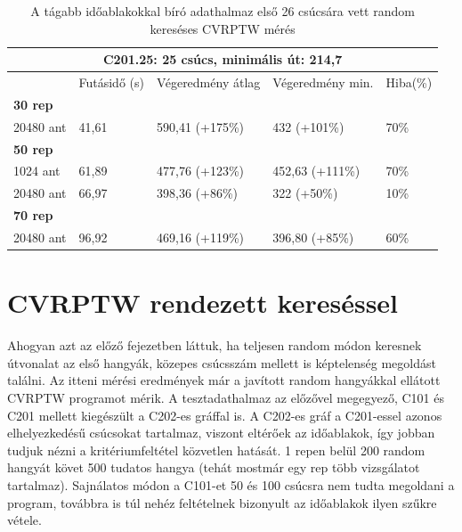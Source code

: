 \begin{table}[ht!]
	\centering
	\begin{tabular}{|p{1.75cm}||p{2cm}|p{3.25cm}|p{3.25cm}|p{1.5cm}|}
		\hline
		\multicolumn{5}{|c|}{C201.25: 25 csúcs, minimális út: 214,7} \\
		\hline
		& Futásidő (s) & Végeredmény átlag & Végeredmény min. & Hiba(\%) \\
		\hline
		\textbf{30 rep} &  &  &  &  \\
		20480 ant & 41,61 & 590,41 (+175\%) & 432 (+101\%) & 70\%  \\
		\hline
		\textbf{50 rep} &  &  &  &  \\
		1024 ant & 61,89 & 477,76 (+123\%) & 452,63 (+111\%) & 70\% \\
		20480 ant & 66,97 & 398,36 (+86\%) & 322 (+50\%) & 10\% \\
		\hline
		\textbf{70 rep} &  &  &  &  \\
		20480 ant & 96,92 & 469,16 (+119\%) & 396,80 (+85\%) & 60\% \\
		\hline
	\end{tabular}
	\caption{A tágabb időablakokkal bíró adathalmaz első 26 csúcsára vett random kereséses CVRPTW mérés}
	\label{table:VRTPW_25_2}
\end{table}



\section{CVRPTW rendezett kereséssel}

Ahogyan azt az előző fejezetben láttuk, ha teljesen random módon keresnek útvonalat az első hangyák, közepes csúcsszám mellett is képtelenség megoldást találni. Az itteni mérési eredmények már a javított random hangyákkal ellátott CVRPTW programot mérik. A tesztadathalmaz az előzővel megegyező, C101 és C201 mellett kiegészült a C202-es gráffal is. A C202-es gráf a C201-essel azonos elhelyezkedésű csúcsokat tartalmaz, viszont eltérőek az időablakok, így jobban tudjuk nézni a kritériumfeltétel közvetlen hatását. 1 repen belül 200 random hangyát követ 500 tudatos hangya (tehát mostmár egy rep több vizsgálatot tartalmaz). Sajnálatos módon a C101-et 50 és 100 csúcsra nem tudta megoldani a program, továbbra is túl nehéz feltételnek bizonyult az időablakok ilyen szűkre vétele.

